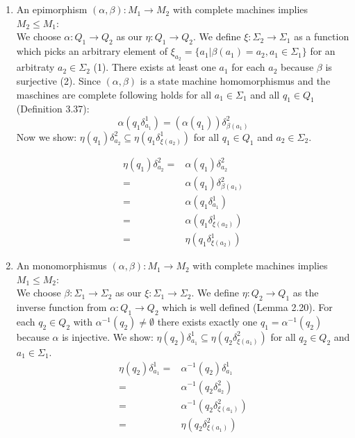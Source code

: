 \documentclass[a4paper,12pt,numbers=noenddot]{scrreport}
\begin{document}

\chapter{}
\section{}
\begin{enumerate}
    \item An epimorphism $(\alpha, \beta): M_1 \rightarrow M_2$ with complete machines implies $M_2 \leq M_1$: \\
We choose $\alpha : Q_1 \rightarrow Q_2$ as our $\eta: Q_1 \rightarrow Q_2$.
We define $\xi: \Sigma_2 \rightarrow \Sigma_1$ as a function which picks an arbitrary element of $\xi_{a_2} = \{a_1 | \beta(a_1) = a_2, a_1 \in \Sigma_1\}$ for an arbitraty $a_2 \in \Sigma_2$ (1).
There exists at least one $a_1$ for each $a_2$ because $\beta$ is surjective (2).
Since $(\alpha,\beta)$ is a state machine homomorphismus and the maschines are complete following holds for all $a_1 \in \Sigma_1$ and all $q_1 \in Q_1$ (Definition 3.37):
$$
\alpha(q_1\delta^1_{a_1}) = (\alpha(q_1))\delta^2_{\beta(a_1)}
$$ 
Now we show: $\eta(q_1)\delta^2_{a_2} \subseteq \eta(q_1\delta^1_{\xi(a_2)})$ for all $q_1 \in Q_1$ and $a_2 \in \Sigma_2$.

\begin{align*}
    \eta(q_1)\delta^2_{a_2} = & \alpha(q_1)\delta^2_{a_2} \\
                 = & \alpha(q_1)\delta^2_{\beta(a_1)} \label{eq1}\tag{2} \\
                 = & \alpha(q_1\delta^1_{a_1}) \\
                 = & \alpha(q_1\delta^1_{\xi(a_2)})\label{eq2}\tag{1} \\
                 = & \eta(q_1\delta^1_{\xi(a_2)})
\end{align*}
    \item An monomorphismus $(\alpha, \beta): M_1 \rightarrow M_2$ with complete machines implies $M_1 \leq M_2$: \\
        We choose $\beta: \Sigma_1 \rightarrow \Sigma_2$ as our $\xi: \Sigma_1 \rightarrow \Sigma_2$.
        We define $\eta: Q_2 \rightarrow Q_1$ as the inverse function from $\alpha: Q_1 \rightarrow Q_2$ which is well defined (Lemma 2.20).
        For each $q_2 \in Q_2$ with $\alpha^{-1}(q_2) \neq \emptyset$ there exists exactly one $q_1 = \alpha^{-1}(q_2)$ because $\alpha$ is injective.
        We show: $\eta(q_2)\delta^1_{a_1} \subseteq \eta(q_2\delta^2_{\xi(a_1)})$ for all $q_2 \in Q_2$ and $a_1 \in \Sigma_1$.
    \begin{align*}
        \eta(q_2)\delta^1_{a_1} = & \alpha^{-1}(q_2)\delta^1_{a_1} \\
                     = & \alpha^{-1}(q_2\delta^2_{a_2}) \\
                     = & \alpha^{-1}(q_2\delta^2_{\xi(a_1)}) \\
                     = & \eta(q_2\delta^2_{\xi(a_1)})
    \end{align*}
\end{enumerate}
\end{document}
